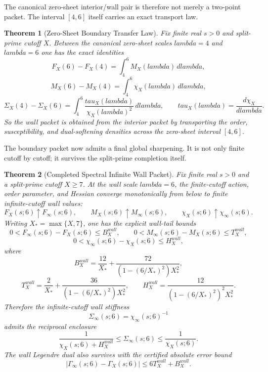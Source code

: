 \documentclass[12pt,a4paper]{article}
\def\mathrm#1{#1}%
\def\mathcal#1{#1}%
\def\lambda{lambda}%
\def\tau{tau}%
\newtheorem{theorem}{Theorem}[section]
\theoremstyle{definition}
\begin{document}
The canonical zero-sheet interior/wall pair is therefore not merely a two-point packet. The interval
$[4,6]$ itself carries an exact transport law.

\begin{theorem}[Zero-Sheet Boundary Transfer Law]
Fix finite real $s>0$ and split-prime cutoff $X$. Between the canonical zero-sheet scales $\lambda=4$ and $\lambda=6$ one has the exact identities
\[
\mathcal F_X(6)-\mathcal F_X(4)=\int_4^6 \mathcal M_X(\lambda)\,d\lambda,
\]
\[
\mathcal M_X(6)-\mathcal M_X(4)=\int_4^6 \chi_X(\lambda)\,d\lambda,
\]
\[
\Sigma_X(4)-\Sigma_X(6)=\int_4^6 \frac{\tau_X(\lambda)}{\chi_X(\lambda)^2}\,d\lambda,
\qquad
\tau_X(\lambda)=\frac{d\chi_X}{d\lambda}.
\]
So the wall packet is obtained from the interior packet by transporting the order, susceptibility, and dual-softening densities across the zero-sheet interval $[4,6]$.
\end{theorem}

The boundary packet now admits a final global sharpening. It is not only finite cutoff by cutoff; it survives the split-prime completion itself.

\begin{theorem}[Completed Spectral Infinite Wall Packet]
Fix finite real $s>0$ and a split-prime cutoff $X\ge 7$. At the wall scale $\lambda=6$, the finite-cutoff action, order parameter, and Hessian converge monotonically from below to finite infinite-cutoff wall values:
\[
\mathcal F_X(s;6)\uparrow\mathcal F_\infty(s;6),
\qquad
\mathcal M_X(s;6)\uparrow\mathcal M_\infty(s;6),
\qquad
\chi_X(s;6)\uparrow\chi_\infty(s;6).
\]
Writing $X_*=\max\{X,7\}$, one has the explicit wall-tail bounds
\[
0<\mathcal F_\infty(s;6)-\mathcal F_X(s;6)\le B_X^{\mathrm{wall}},
\qquad
0<\mathcal M_\infty(s;6)-\mathcal M_X(s;6)\le T_X^{\mathrm{wall}},
\]
\[
0<\chi_\infty(s;6)-\chi_X(s;6)\le H_X^{\mathrm{wall}},
\]
where
\[
B_X^{\mathrm{wall}}=\frac{12}{X_*}+\frac{72}{(1-(6/X_*)^2)X_*^2},
\]
\[
T_X^{\mathrm{wall}}=\frac{2}{X_*}+\frac{36}{(1-(6/X_*)^2)X_*^2},
\qquad
H_X^{\mathrm{wall}}=\frac{12}{(1-(6/X_*)^2)^2 X_*^2}.
\]
Therefore the infinite-cutoff wall stiffness
\[
\Sigma_\infty(s;6)=\chi_\infty(s;6)^{-1}
\]
admits the reciprocal enclosure
\[
\frac{1}{\chi_X(s;6)+H_X^{\mathrm{wall}}}
\le
\Sigma_\infty(s;6)
\le
\frac{1}{\chi_X(s;6)}.
\]
The wall Legendre dual also survives with the certified absolute error bound
\[
\bigl|\Gamma_\infty(s;6)-\Gamma_X(s;6)\bigr|\le 6T_X^{\mathrm{wall}}+B_X^{\mathrm{wall}}.
\]
\end{theorem}
\end{document}
